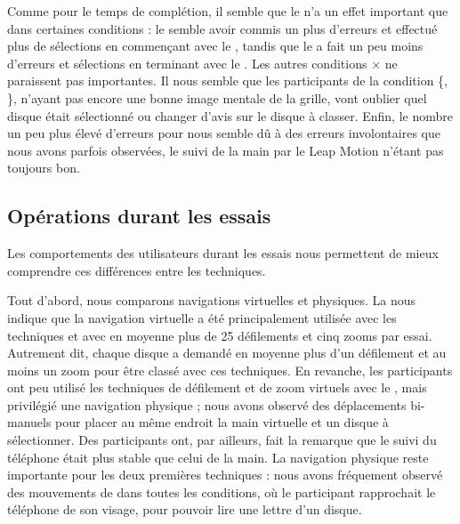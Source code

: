 Comme pour le temps de complétion, il semble que le  n'a un effet important que dans certaines conditions  : le  semble avoir commis un plus d'erreurs et effectué plus de sélections en commençant avec le , tandis que le  a fait un peu moins d'erreurs et sélections en terminant avec le . Les autres conditions  $\times$  ne paraissent pas importantes. Il nous semble que les participants de la condition \{, \}, n'ayant pas encore une bonne image mentale de la grille, vont oublier quel disque était sélectionné ou changer d'avis sur le disque à classer. Enfin, le nombre un peu plus élevé d'erreurs pour  nous semble dû à des erreurs involontaires que nous avons parfois observées, le suivi de la main par le Leap Motion n'étant pas toujours bon.

\subsection{Opérations durant les essais}
\label{subsec:experiment_results_operations}

Les comportements des utilisateurs durant les essais nous permettent de mieux comprendre ces différences entre les techniques.



Tout d'abord, nous comparons navigations virtuelles et physiques. La  nous indique que la navigation virtuelle a été principalement utilisée avec les techniques  et  avec en moyenne plus de 25 défilements et cinq zooms par essai. Autrement dit, chaque disque a demandé en moyenne plus d'un défilement et au moins un zoom pour être classé avec ces techniques. En revanche, les participants ont peu utilisé les techniques de défilement et de zoom virtuels avec le , mais privilégié une navigation physique  ; nous avons observé des déplacements bi-manuels pour placer au même endroit la main virtuelle et un disque à sélectionner. Des participants ont, par ailleurs, fait la remarque que le suivi du téléphone était plus stable que celui de la main. La navigation physique reste importante pour les deux premières techniques  : nous avons fréquement observé des mouvements de  dans toutes les conditions, où le participant rapprochait le téléphone de son visage, pour pouvoir lire une lettre d'un disque.

